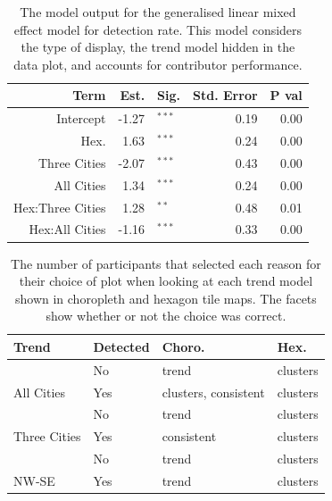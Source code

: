 \documentclass[times, doublespace]{anzsauth}
\begin{document}
\begin{table}[t]

\caption{\label{tab:detect-glmer1}The model output for the generalised linear mixed effect model for detection rate. This model considers the type of display, the trend model hidden in the data plot, and accounts for contributor performance.}
\centering
\begin{tabular}[t]{rrlrr}
\toprule
Term & Est. & Sig. & Std. Error & P val\\
\midrule
Intercept & -1.27 & $^{***}$ & 0.19 & 0.00\\
Hex. & 1.63 & $^{***}$ & 0.24 & 0.00\\
\addlinespace
Three Cities & -2.07 & $^{***}$ & 0.43 & 0.00\\
All Cities & 1.34 & $^{***}$ & 0.24 & 0.00\\
\addlinespace
Hex:Three Cities & 1.28 & $^{**}$ & 0.48 & 0.01\\
Hex:All Cities & -1.16 & $^{***}$ & 0.33 & 0.00\\
\bottomrule
\end{tabular}
\end{table}

\begin{table}[t]

\caption{\label{tab:reason}The number of participants that selected each reason for their choice of plot when looking at each trend model shown in choropleth and hexagon tile maps. The facets show whether or not the choice was correct.}
\centering
\begin{tabular}[t]{llll}
\toprule
Trend & Detected & Choro. & Hex.\\
\midrule
 & No & trend & clusters\\
\cmidrule{2-4}
\multirow{-2}{*}{\raggedright\arraybackslash All Cities} & Yes & clusters, consistent & clusters\\
\cmidrule{1-4}
 & No & trend & clusters\\
\cmidrule{2-4}
\multirow{-2}{*}{\raggedright\arraybackslash Three Cities} & Yes & consistent & clusters\\
\cmidrule{1-4}
 & No & trend & clusters\\
\cmidrule{2-4}
\multirow{-2}{*}{\raggedright\arraybackslash NW-SE} & Yes & trend & clusters\\
\bottomrule
\end{tabular}
\end{table}
\end{document}
